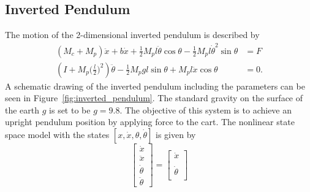 \documentclass[letterpaper, 10 pt, conference]{ieeeconf}  %
\begin{document}
\subsection{Inverted Pendulum}
The motion of the 2-dimensional inverted pendulum is described by 
\begin{align}
(M_c +M_p)\ddot{x} + b\dot{x} +\frac{1}{2}M_p l \ddot{\theta} \cos{\theta}- \frac{1}{2}M_p l \dot{\theta}^2\sin{\theta} &=F\\
(I+M_p\Big(\frac{l}{2}\Big)^2)\ddot{\theta}-\frac{1}{2}M_p g l \sin{\theta} + M_p l \ddot{x} \cos{\theta}&= 0.
\end{align}
A schematic drawing of the inverted pendulum including the parameters can be seen in Figure~\ref{fig:inverted_pendulum}. The standard gravity on the surface of the earth $g$ is set to be $g=9.8$. The objective of this system is to achieve an upright pendulum position by applying force to the cart. The nonlinear state space model with the states $[ x, \dot{x}, \theta, \dot{\theta}]$ is given by
\begin{equation}
\begin{bmatrix}
\dot{x}\\
\ddot{x}\\
\dot{\theta}\\
\ddot{\theta}
 \end{bmatrix}=
 \begin{bmatrix}
 \dot{x}\\
   \\
   \dot{\theta}
     \\
 \end{bmatrix}
\end{equation}
\end{document}
